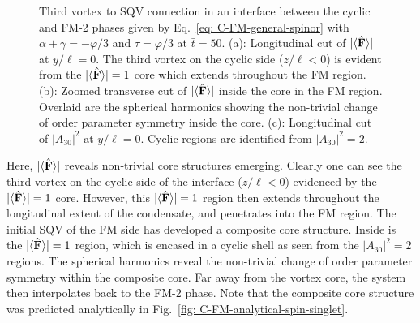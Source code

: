 \begin{figure}[htb!]
    \caption[Dynamics of a one-third vortex to singly quantised vortex
    connection in a cyclic to ferromagnetic interface]
    {\label{fig: C-FM-third-SQV}Third vortex to SQV connection in an
    interface between the cyclic and FM-2 phases given by
    Eq.~\eqref{eq: C-FM-general-spinor} with \(\alpha + \gamma = -\varphi/3\)
    and \(\tau = \varphi/3\) at \(\bar{t} = 50\).
    (a): Longitudinal cut of \(|\langle \hat{\vb{F}} \rangle | \) at \(y/\ell=0\).
    The third vortex on the cyclic side (\(z/\ell < 0\)) is evident from the
    \(|\langle \hat{\vb{F}} \rangle | = 1\) core which extends throughout the FM region.
    (b): Zoomed transverse cut of \(|\langle \hat{\vb{F}} \rangle | \) inside the core in the FM
    region.
    Overlaid are the spherical harmonics showing the non-trivial change
    of order parameter symmetry inside the core.
    (c): Longitudinal cut of \(|A_{30}|^2\) at \(y/\ell=0\).
    Cyclic regions are identified from \(|A_{30}|^2=2\).}
\end{figure}
Here, \(|\langle \hat{\vb{F}} \rangle | \) reveals non-trivial core structures emerging.
Clearly one can see the third vortex on the cyclic side of the interface
(\(z/\ell < 0\)) evidenced by the \(|\langle \hat{\vb{F}} \rangle | = 1\) core.
However, this \(|\langle \hat{\vb{F}} \rangle | = 1\) region then extends throughout the longitudinal
extent of the condensate, and penetrates into the FM region.
The initial SQV of the FM side has developed a composite core structure.
Inside is the \(|\langle \hat{\vb{F}} \rangle | = 1\) region, which is encased in a cyclic shell as
seen from the \(|A_{30}|^2=2\) regions.
The spherical harmonics reveal the non-trivial change of order parameter
symmetry within the composite core.
Far away from the vortex core, the system then interpolates back to the FM-2
phase.
Note that the composite core structure was predicted analytically in
Fig.~\ref{fig: C-FM-analytical-spin-singlet}.

